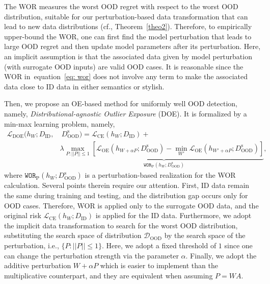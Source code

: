 \documentclass{article} \usepackage{iclr2022_conference,times}
\def\eqref#1{equation~\ref{#1}}
\begin{document}
The WOR measures the worst OOD regret with respect to the worst OOD distribution, suitable for our perturbation-based data transformation that can lead to new data distributions (cf., Theorem~\ref{theo2}). Therefore, to empirically upper-bound the WOR, one can first find the model perturbation that leads to large OOD regret and then update model parameters after its perturbation. Here, an implicit assumption is that the associated data given by model perturbation (with surrogate OOD inputs) are valid OOD cases. It is reasonable since the WOR in~\eqref{eq: wor} does not involve any term to make the associated data close to ID data in either semantics or stylish. 



Then, we propose an OE-based method for uniformly well OOD detection, namely, \emph{Distributional-agnostic Outlier Exposure} (DOE). It is formalized by a min-max learning problem, namely,
\begin{align}
    \mathcal{L}_\text{DOE}(h_{W}; D_\text{ID},  & ~ D^\text{s}_\text{OOD})= {\mathcal{L}}_\text{CE} (h_W;   D_\text{ID}) + \nonumber
    \\ & \lambda \underbrace{\max_{P: \lvert\lvert P\rvert\rvert \le 1} \left[\mathcal{L}_\text{OE}(h_{W+ \alpha P}; D^\text{s}_\text{OOD}) - \min_{W'} \mathcal{L}_\text{OE}(h_{W' + \alpha P}; D^\text{s}_\text{OOD})\right]}_{{{\texttt{WOR}_\text{P}}}(h_{W}; D^\text{s}_\text{OOD})}, \label{eq: doe}
\end{align}
where ${{{\texttt{WOR}_\text{P}}}(h_{W}; D^\text{s}_\text{OOD})}$ is a perturbation-based realization for the WOR calculation. Several points therein require our attention. First, ID data remain the same during training and testing, and the distribution gap occurs only for OOD cases. Therefore, WOR is applied only to the surrogate OOD data, and the original risk $\mathcal{L}_\text{CE}(h_W;  D_\text{ID})$ is applied for the ID data. Furthermore, we adopt the implicit data transformation to search for the worst OOD distribution, substituting the search space of distribution $\mathcal{D}_\text{OOD}$ by the search space of the perturbation, i.e., $\{P: \lvert\lvert P\rvert\rvert \le 1\}$. Here, we adopt a fixed threshold of $1$ since one can change the perturbation strength via the parameter $\alpha$. Finally, we adopt the additive perturbation $W+ \alpha P$ which is easier to implement than the multiplicative counterpart, and they are equivalent when assuming $P = WA$. 
\end{document}

